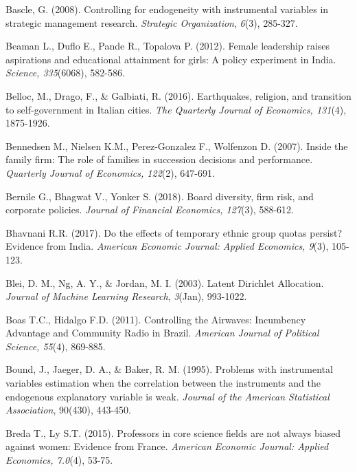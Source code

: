 \documentclass[english]{article}
\begin{document}
\begin{singlespace}
\begin{list}{}{\setlength\itemindent{-\leftmargin}}
\item Bascle, G. (2008). Controlling for endogeneity with instrumental variables in strategic management research. \emph{Strategic Organization}, \emph{6}(3), 285-327.

\item *Beaman L., Duflo E., Pande R., Topalova P. (2012). Female leadership raises aspirations and educational attainment for girls: A policy experiment in India. \emph{Science, 335}(6068), 582-586.

\item *Belloc, M., Drago, F., \& Galbiati, R. (2016). Earthquakes, religion, and transition to self-government in Italian cities. \emph{The Quarterly Journal of Economics, 131}(4), 1875-1926.

\item *Bennedsen M., Nielsen K.M., Perez-Gonzalez F., Wolfenzon D. (2007).  Inside the family firm: The role of families in succession decisions and performance. \emph{Quarterly Journal of Economics, 122}(2), 647-691.

\item *Bernile G., Bhagwat V., Yonker S. (2018). Board diversity, firm risk, and corporate policies. \emph{Journal of Financial Economics, 127}(3), 588-612.

\item *Bhavnani R.R. (2017). Do the effects of temporary ethnic group quotas persist? Evidence from India. \emph{American Economic Journal: Applied Economics, 9}(3), 105-123.

\item Blei, D. M., Ng, A. Y., \& Jordan, M. I. (2003). Latent Dirichlet Allocation. \emph{Journal of Machine Learning Research}, \emph{3}(Jan), 993-1022.

\item *Boas T.C., Hidalgo F.D. (2011). Controlling the Airwaves: Incumbency Advantage and Community Radio in Brazil. \emph{American Journal of Political Science, 55}(4), 869-885.

\item Bound, J., Jaeger, D. A., \& Baker, R. M. (1995). Problems with instrumental variables estimation when the correlation between the instruments and the endogenous explanatory variable is weak.  \emph{Journal of the American Statistical Association}, 90(430), 443-450.

\item *Breda T., Ly S.T. (2015). Professors in core science fields are not always biased against women: Evidence from France. \emph{American Economic Journal: Applied Economics, 7.0}(4), 53-75.


\end{list}
\end{singlespace}
\end{document}
